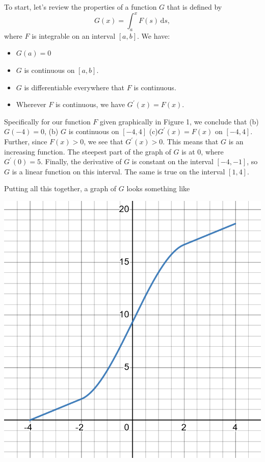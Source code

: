 \documentclass[12pt,fleqn,answers]{exam}
\begin{document}
\begin{solution}

To start, let's review the properties of a function $G$ that is defined by
\begin{equation*}
    G(x) = \int_{a}^x F(s) \, \mathrm{d}s,
\end{equation*} 
where $F$ is integrable on an interval $[a,b]$. We have:

\begin{itemize}
\item $G(a)=0$
\item $G$ is continuous on $[a,b]$.
\item $G$ is differentiable everywhere that $F$ is continuous.
\item Wherever $F$ is continuous, we have $G^\prime(x) = F(x)$.
\end{itemize}
Specifically for our function $F$ given graphically in Figure 1, we 
conclude that (b) $G(-4) = 0$, (b) $G$ is continuous on $[-4,4]$  
  (c)$G^\prime(x) = F(x)$  on $[-4,4]$. Further, since 
 $F(x) > 0$, we see 
  that $G^\prime(x) > 0$. This means that $G$ is an increasing 
  function. The steepest part of the graph of $G$ is at $0$, where
  $G^\prime(0) = 5$.  Finally, the derivative of $G$ is constant on 
  the interval $[-4,-1]$, so $G$ is a linear function on this interval.
  The same is true on the interval $[1,4]$.

  Putting all this together, a graph of $G$ looks something like

  \vfill 
  \newpage 
    \begin{center}
    \includegraphics[scale=0.4]{desmos-graph(51).png}
  \end{center}


  
\end{solution}
    
\end{document}
